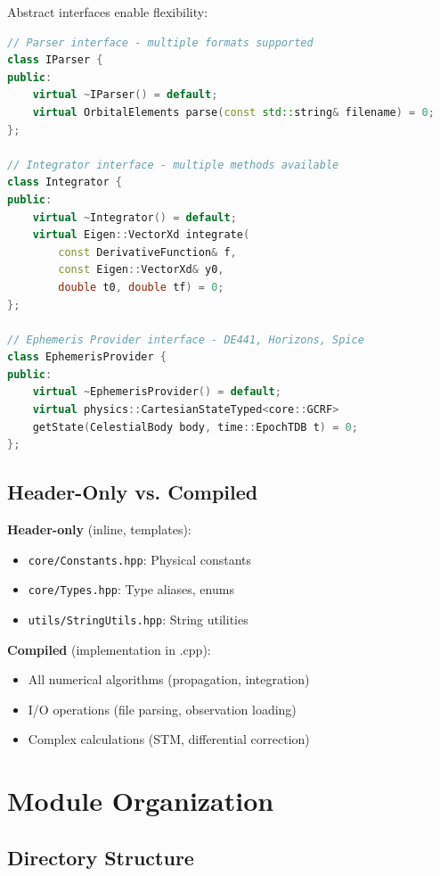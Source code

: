 Abstract interfaces enable flexibility:

\begin{lstlisting}[language=C++,caption={Interface examples}]
// Parser interface - multiple formats supported
class IParser {
public:
    virtual ~IParser() = default;
    virtual OrbitalElements parse(const std::string& filename) = 0;
};

// Integrator interface - multiple methods available
class Integrator {
public:
    virtual ~Integrator() = default;
    virtual Eigen::VectorXd integrate(
        const DerivativeFunction& f, 
        const Eigen::VectorXd& y0, 
        double t0, double tf) = 0;
};

// Ephemeris Provider interface - DE441, Horizons, Spice
class EphemerisProvider {
public:
    virtual ~EphemerisProvider() = default;
    virtual physics::CartesianStateTyped<core::GCRF>
    getState(CelestialBody body, time::EpochTDB t) = 0;
};
\end{lstlisting}

\subsection{Header-Only vs. Compiled}

\textbf{Header-only} (inline, templates):
\begin{itemize}
    \item \texttt{core/Constants.hpp}: Physical constants
    \item \texttt{core/Types.hpp}: Type aliases, enums
    \item \texttt{utils/StringUtils.hpp}: String utilities
\end{itemize}

\textbf{Compiled} (implementation in .cpp):
\begin{itemize}
    \item All numerical algorithms (propagation, integration)
    \item I/O operations (file parsing, observation loading)
    \item Complex calculations (STM, differential correction)
\end{itemize}

\section{Module Organization}

\subsection{Directory Structure}

